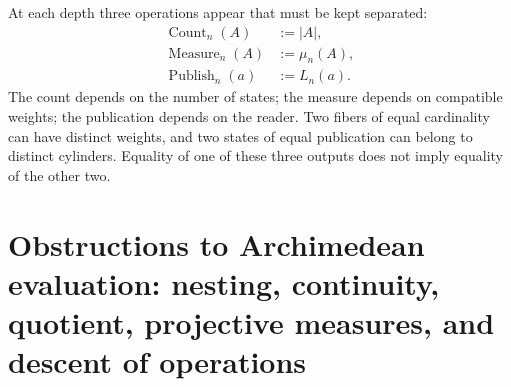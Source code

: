 At each depth three operations appear that must be kept separated:
\begin{align}
 \operatorname{Count}_n(A)&:=|A|,
 \label{p12-83-c18-s1:eq:operacion-conteo-u024}\\
 \operatorname{Measure}_n(A)&:=\mu_n(A),
 \label{p12-83-c18-s1:eq:operacion-medida-u024}\\
 \operatorname{Publish}_n(a)&:=L_n(a).
 \label{p12-83-c18-s1:eq:operacion-publicacion-u024}
\end{align}
The count depends on the number of states; the measure depends on compatible
weights; the publication depends on the reader. Two fibers of equal
cardinality can have distinct weights, and two states of equal publication
can belong to distinct cylinders. Equality of one of these three
outputs does not imply equality of the other two.

\section{Obstructions to Archimedean evaluation: nesting, continuity, quotient, projective measures, and descent of operations}

